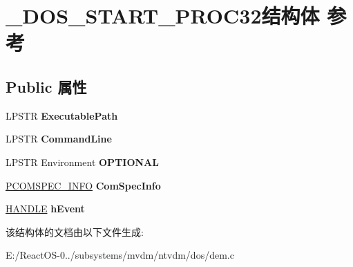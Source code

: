 \hypertarget{struct___d_o_s___s_t_a_r_t___p_r_o_c32}{}\section{\+\_\+\+D\+O\+S\+\_\+\+S\+T\+A\+R\+T\+\_\+\+P\+R\+O\+C32结构体 参考}
\label{struct___d_o_s___s_t_a_r_t___p_r_o_c32}
\subsection*{Public 属性}
\begin{DoxyCompactItemize}
\item 
\mbox{\label{struct___d_o_s___s_t_a_r_t___p_r_o_c32_afefd18f63fa230267bf2805470960849}} 
L\+P\+S\+TR {\bfseries Executable\+Path}
\item 
\mbox{\label{struct___d_o_s___s_t_a_r_t___p_r_o_c32_a0712b29835d45258447b281406bc97a1}} 
L\+P\+S\+TR {\bfseries Command\+Line}
\item 
\mbox{\label{struct___d_o_s___s_t_a_r_t___p_r_o_c32_a35b363d80983275c09669f0d485f65e5}} 
L\+P\+S\+TR Environment {\bfseries O\+P\+T\+I\+O\+N\+AL}
\item 
\mbox{\label{struct___d_o_s___s_t_a_r_t___p_r_o_c32_a2f32e27c1260dcd264fc36e60069ef41}} 
\hyperlink{struct___c_o_m_s_p_e_c___i_n_f_o}{P\+C\+O\+M\+S\+P\+E\+C\+\_\+\+I\+N\+FO} {\bfseries Com\+Spec\+Info}
\item 
\mbox{\label{struct___d_o_s___s_t_a_r_t___p_r_o_c32_a20f95fb2673e2177b174bcc3d962c2c7}} 
\hyperlink{interfacevoid}{H\+A\+N\+D\+LE} {\bfseries h\+Event}
\end{DoxyCompactItemize}


该结构体的文档由以下文件生成\+:\begin{DoxyCompactItemize}
\item 
E\+:/\+React\+O\+S-\/0../subsystems/mvdm/ntvdm/dos/dem.\+c\end{DoxyCompactItemize}
